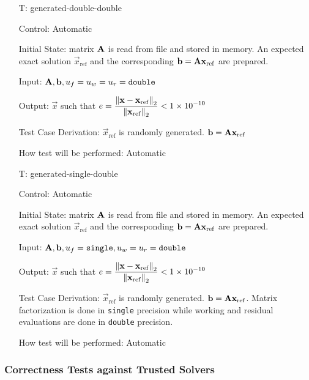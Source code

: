 \documentclass[12pt, titlepage]{article}
\newcounter{testnum} %
\begin{document}
\begin{itemize}

\item[T\refstepcounter{testnum}\thetestnum \label{T:gdd}:]{generated-double-double}

Control: Automatic

Initial State: matrix \(\mathbf{A}\) is read from file and stored in memory.
An expected exact solution \(\vec{x}_\mathrm{ref}\) and the corresponding \(\mathbf{b} =
\mathbf{A}\mathbf{x}_\mathrm{ref}\) are prepared.

Input: \(\mathbf{A}, \mathbf{b}, u_f = u_w = u_r = \texttt{double}\)

Output: \(\vec{x}\) such that \(e = \displaystyle \frac{\left\lVert\mathbf{x} -
    \mathbf{x}_\mathrm{ref}\right\rVert_2}{\left\lVert\mathbf{x}_\mathrm{ref}\right\rVert_2} < \num{1e-10}\)

Test Case Derivation: \(\vec{x}_\mathrm{ref}\) is randomly generated. \(\mathbf{b} = \mathbf{A}\mathbf{x}_\mathrm{ref}\)

How test will be performed: Automatic

\item[T\refstepcounter{testnum}\thetestnum \label{T:gsd}:]{generated-single-double}

Control: Automatic

Initial State: matrix \(\mathbf{A}\) is read from file and stored in memory.
An expected exact solution \(\vec{x}_\mathrm{ref}\) and the corresponding \(\mathbf{b} =
\mathbf{A}\mathbf{x}_\mathrm{ref}\) are prepared.

Input: \(\mathbf{A}, \mathbf{b}, u_f = \texttt{single}, u_w = u_r = \texttt{double}\)

Output: \(\vec{x}\) such that \(e = \displaystyle \frac{\left\lVert\mathbf{x} -
    \mathbf{x}_\mathrm{ref}\right\rVert_2}{\left\lVert\mathbf{x}_\mathrm{ref}\right\rVert_2} < \num{1e-10}\)

Test Case Derivation: \(\vec{x}_\mathrm{ref}\) is randomly generated. \(\mathbf{b} =
\mathbf{A}\mathbf{x}_\mathrm{ref}\). Matrix factorization is done in \texttt{single}
precision while working and residual evaluations are done in \texttt{double}
precision.

How test will be performed: Automatic

\end{itemize}

\subsubsection{Correctness Tests against Trusted Solvers}
\label{sec:corr-tests-against}
\end{document}
